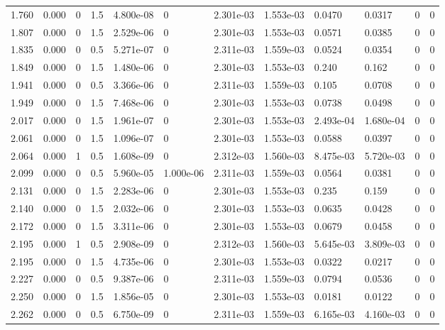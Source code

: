 \documentclass[preview]{standalone}
\begin{document}
{{{\begin{tabular}{L{1.2cm}C{1.2cm} C{0.3cm}C{0.5cm} C{1.4cm}C{1.4cm} C{1.4cm}C{1.4cm} C{1.6cm}C{1.6cm} C{1.6cm}C{1.6cm}}
  1.760  &  0.000  & 0     & 1.5 &  4.800e-08  & 0  &  2.301e-03&   1.553e-03& 0.0470 & 0.0317   &  0 & 0  \\ 
  1.807  &  0.000  & 0     & 1.5 &  2.529e-06  & 0  &  2.301e-03&   1.553e-03& 0.0571 & 0.0385   &  0 & 0  \\ 
  1.835  &  0.000  & 0     & 0.5 &  5.271e-07  & 0  &  2.311e-03&   1.559e-03& 0.0524 & 0.0354   &  0 & 0  \\ 
  1.849  &  0.000  & 0     & 1.5 &  1.480e-06  & 0  &  2.301e-03&   1.553e-03& 0.240 & 0.162   &  0 & 0  \\ 
  1.941  &  0.000  & 0     & 0.5 &  3.366e-06  & 0  &  2.311e-03&   1.559e-03& 0.105 & 0.0708   &  0 & 0  \\ 
  1.949  &  0.000  & 0     & 1.5 &  7.468e-06  & 0  &  2.301e-03&   1.553e-03& 0.0738 & 0.0498   &  0 & 0  \\ 
  2.017  &  0.000  & 0     & 1.5 &  1.961e-07  & 0  &  2.301e-03&   1.553e-03& 2.493e-04 & 1.680e-04   &  0 & 0  \\ 
  2.061  &  0.000  & 0     & 1.5 &  1.096e-07  & 0  &  2.301e-03&   1.553e-03& 0.0588 & 0.0397   &  0 & 0  \\ 
  2.064  &  0.000  & 1     & 0.5 &  1.608e-09  & 0  &  2.312e-03&   1.560e-03& 8.475e-03 & 5.720e-03   &  0 & 0  \\ 
  2.099  &  0.000  & 0     & 0.5 &  5.960e-05  & 1.000e-06  &  2.311e-03&   1.559e-03& 0.0564 & 0.0381   &  0 & 0  \\ 
  2.131  &  0.000  & 0     & 1.5 &  2.283e-06  & 0  &  2.301e-03&   1.553e-03& 0.235 & 0.159   &  0 & 0  \\ 
  2.140  &  0.000  & 0     & 1.5 &  2.032e-06  & 0  &  2.301e-03&   1.553e-03& 0.0635 & 0.0428   &  0 & 0  \\ 
  2.172  &  0.000  & 0     & 1.5 &  3.311e-06  & 0  &  2.301e-03&   1.553e-03& 0.0679 & 0.0458   &  0 & 0  \\ 
  2.195  &  0.000  & 1     & 0.5 &  2.908e-09  & 0  &  2.312e-03&   1.560e-03& 5.645e-03 & 3.809e-03   &  0 & 0  \\ 
  2.195  &  0.000  & 0     & 1.5 &  4.735e-06  & 0  &  2.301e-03&   1.553e-03& 0.0322 & 0.0217   &  0 & 0  \\ 
  2.227  &  0.000  & 0     & 0.5 &  9.387e-06  & 0  &  2.311e-03&   1.559e-03& 0.0794 & 0.0536   &  0 & 0  \\ 
  2.250  &  0.000  & 0     & 1.5 &  1.856e-05  & 0  &  2.301e-03&   1.553e-03& 0.0181 & 0.0122   &  0 & 0  \\ 
  2.262  &  0.000  & 0     & 0.5 &  6.750e-09  & 0  &  2.311e-03&   1.559e-03& 6.165e-03 & 4.160e-03   &  0 & 0  \\ 

\end{tabular}}}}
\end{document}
